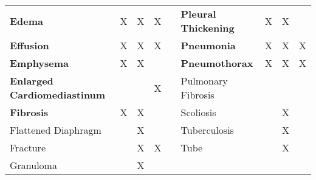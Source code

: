 \begin{table}[htbp]
{\begin{tabular}{lcccrlccc}
\cellcolor[HTML]{E9ECE6}\textbf{Edema} & \cellcolor[HTML]{E9ECE6}X & \cellcolor[HTML]{E9ECE6}X & \cellcolor[HTML]{E9ECE6}X &  & \textbf{Pleural Thickening} & X & X &  \\
\textbf{Effusion} & X & X & X &  & \cellcolor[HTML]{E9ECE6}\textbf{Pneumonia} & \cellcolor[HTML]{E9ECE6}X & \cellcolor[HTML]{E9ECE6}X & \cellcolor[HTML]{E9ECE6}X \\
\textbf{Emphysema} & X & X &  &  & \textbf{Pneumothorax} & X & X & X \\
\cellcolor[HTML]{E9ECE6}\textbf{Enlarged   Cardiomediastinum} & \cellcolor[HTML]{E9ECE6} & \cellcolor[HTML]{E9ECE6} & \cellcolor[HTML]{E9ECE6}X & \multicolumn{1}{l}{} & {Pulmonary Fibrosis} &  &  &  \\
\textbf{Fibrosis} & X & X &  &  & {Scoliosis} &  & X &  \\
{Flattened   Diaphragm} &  & X &  &  & {Tuberculosis} &  & X &  \\
{Fracture} &  & X & X &  & {Tube} &  & X &  \\
{Granuloma} &  & X &  &  &  & \multicolumn{1}{l}{} & \multicolumn{1}{l}{} & \multicolumn{1}{l}{}
\end{tabular}}
\end{table}


